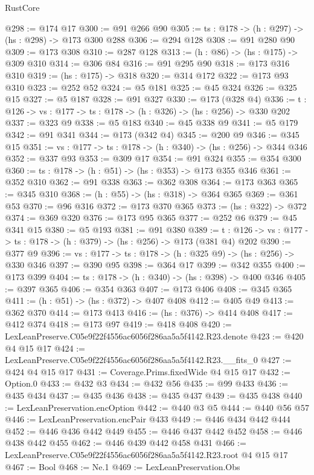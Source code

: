 \begin{lexlean}{RustCore}
\begin{coremodule}
@298 := @174 @17
@300 := @91 @266 @90
@305 := {ts : @178} -> (h : @297) -> (hs : @298) -> @173 @300 @288
@306 := @294 @128
@308 := @91 @280 @90
@309 := @173 @308
@310 := @287 @128
@313 := (h : @86) -> (hs : @175) -> @309 @310
@314 := @306 @84
@316 := @91 @295 @90
@318 := @173 @316 @310
@319 := (hs : @175) -> @318
@320 := @314 @172
@322 := @173 @93 @310
@323 := @252 @52
@324 := @5 @181
@325 := @45 @324
@326 := @325 @15
@327 := @5 @187
@328 := @91 @327
@330 := @173 (@328 @4)
@336 := {t : @126} -> {vs : @177} -> {ts : @178} -> (h : @326) -> (hs : @256) -> @330 @202
@337 := @323 @9
@338 := @5 @183
@340 := @45 @338 @9
@341 := @5 @179
@342 := @91 @341
@344 := @173 (@342 @4)
@345 := @200 @9
@346 := @345 @15
@351 := {vs : @177} -> {ts : @178} -> (h : @340) -> (hs : @256) -> @344 @346
@352 := @337 @93
@353 := @309 @17
@354 := @91 @324
@355 := @354 @300
@360 := {ts : @178} -> (h : @51) -> (hs : @353) -> @173 @355 @346
@361 := @352 @310
@362 := @91 @338
@363 := @362 @308
@364 := @173 @363
@365 := @345 @310
@368 := (h : @55) -> (hs : @318) -> @364 @365
@369 := @361 @53
@370 := @96 @316
@372 := @173 @370 @365
@373 := (hs : @322) -> @372
@374 := @369 @320
@376 := @173 @95 @365
@377 := @252 @6
@379 := @45 @341 @15
@380 := @5 @193
@381 := @91 @380
@389 := {t : @126} -> {vs : @177} -> {ts : @178} -> (h : @379) -> (hs : @256) -> @173 (@381 @4) @202
@390 := @377 @9
@396 := {vs : @177} -> {ts : @178} -> (h : @325 @9) -> (hs : @256) -> @330 @346
@397 := @390 @95
@398 := @364 @17
@399 := @342 @355
@400 := @173 @399
@404 := {ts : @178} -> (h : @340) -> (hs : @398) -> @400 @346
@405 := @397 @365
@406 := @354 @363
@407 := @173 @406
@408 := @345 @365
@411 := (h : @51) -> (hs : @372) -> @407 @408
@412 := @405 @49
@413 := @362 @370
@414 := @173 @413
@416 := (hs : @376) -> @414 @408
@417 := @412 @374
@418 := @173 @97
@419 := @418 @408
@420 := LexLeanPreserve.C05e9f22f4556ac6056f286aa5a5f4142.R23.denote
@423 := @420 @4 @15 @17
@424 := LexLeanPreserve.C05e9f22f4556ac6056f286aa5a5f4142.R23.__fits_0
@427 := @424 @4 @15 @17
@431 := Coverage.Prims.fixedWide @4 @15 @17
@432 := Option.{0}
@433 := @432 @3
@434 := @432 @56
@435 := @99 @433
@436 := @435 @434
@437 := @435 @436
@438 := @435 @437
@439 := @435 @438
@440 := LexLeanPreservation.encOption
@442 := @440 @3 @5
@444 := @440 @56 @57
@446 := LexLeanPreservation.encPair @433
@449 := @446 @434 @442 @444
@452 := @446 @436 @442 @449
@455 := @446 @437 @442 @452
@458 := @446 @438 @442 @455
@462 := @446 @439 @442 @458 @431
@466 := LexLeanPreserve.C05e9f22f4556ac6056f286aa5a5f4142.R23.root @4 @15 @17
@467 := Bool
@468 := Ne.{1}
@469 := LexLeanPreservation.Obs

\end{coremodule}
\end{lexlean}
